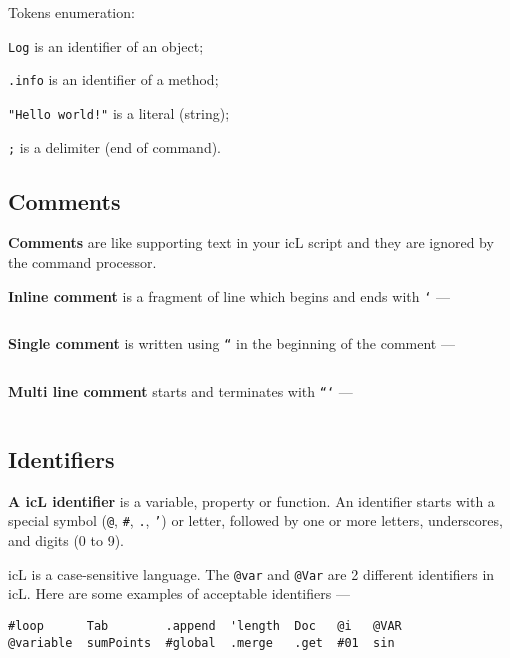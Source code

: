 Tokens enumeration:
\begin{icItems}
\item
	\texttt{Log} is an identifier of an object;
\item
	\texttt{.info} is an identifier of a method;
\item
	\texttt{"Hello world!"} is a literal (string);
\item
	\texttt{;} is a delimiter (end of command).
\end{icItems}

\subsection{Comments}

\textbf{Comments} are like supporting text in your icL script and they are ignored by the command processor.

\textbf{Inline comment} is a fragment of line which begins and ends with \texttt{`} —

\inputminted[linenos]{icl}{../sources/inlinecomment.icL}

\textbf{Single comment} is written using \texttt{``} in the beginning of the comment —

\inputminted[linenos]{icl}{../sources/linecomment.icL}

\textbf{Multi line comment} starts and terminates with \texttt{```} —

\inputminted[linenos]{icl}{../sources/multilinecomment.icL}

\subsection{Identifiers}

\textbf{A icL identifier} is a variable, property or function.
An identifier starts with a special symbol (\texttt{@}, \texttt{#}, \texttt{.}, \texttt{'}) or letter, followed by one or more letters, underscores, and digits (0 to 9).

icL is a case-sensitive language. The \texttt{@var} and \texttt{@Var} are 2 different identifiers in icL. Here are some examples of acceptable identifiers —

\begin{verbatim}
#loop      Tab        .append  'length  Doc   @i   @VAR
@variable  sumPoints  #global  .merge   .get  #01  sin
\end{verbatim}

